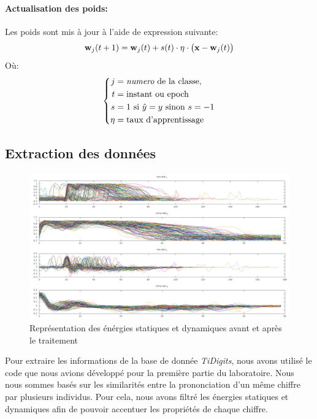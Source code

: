 \documentclass[11pt]{article}
\begin{document}
\paragraph{Actualisation des poids:} Les poids sont mis \`a jour  \`a l'aide
de expression suivante:\\
\begin{equation}
	\begin{aligned}
		{\bf w}_j (t+1) &= {\bf w}_j (t) + s(t) \cdot \eta\cdot
		\big({\bf x} - {\bf w}_j (t)\big)\\
	\end{aligned}
\end{equation}
O\`u: 
\begin{equation}
	\left\{
	\begin{aligned}
		j &= \text{{\em numero} de la classe,} \\
		t &= \text{instant ou epoch} \\
		s &= 1 \text{ si } {\hat y} = y \text{ sinon } s= -1\\
		\eta &= \text{taux d'apprentissage}
	\end{aligned}
	\right .
\end{equation}

\subsection{Extraction des donn\'ees}
\begin{figure}[h]
	\centering
	\includegraphics[scale=.3]{img/preprocessing.png}
	\caption{Repr\'esentation des \'en\'ergies statiques et dynamiques avant et
	apr\`es le traitement}
\end{figure}

Pour extraire les informations de la base de donn\'ee {\em TiDigits}, nous
avons utilis\'e le code que nous avions d\'evelopp\'e pour la premi\`ere
partie du laboratoire.
Nous nous sommes bas\'es sur les similarit\'es entre la prononciation d'un
m\^eme chiffre par plusieurs individus. Pour cela, nous avons filtr\'e
les \'energies statiques et dynamiques afin de pouvoir accentuer les
propri\'et\'es de chaque chiffre.
\end{document}

